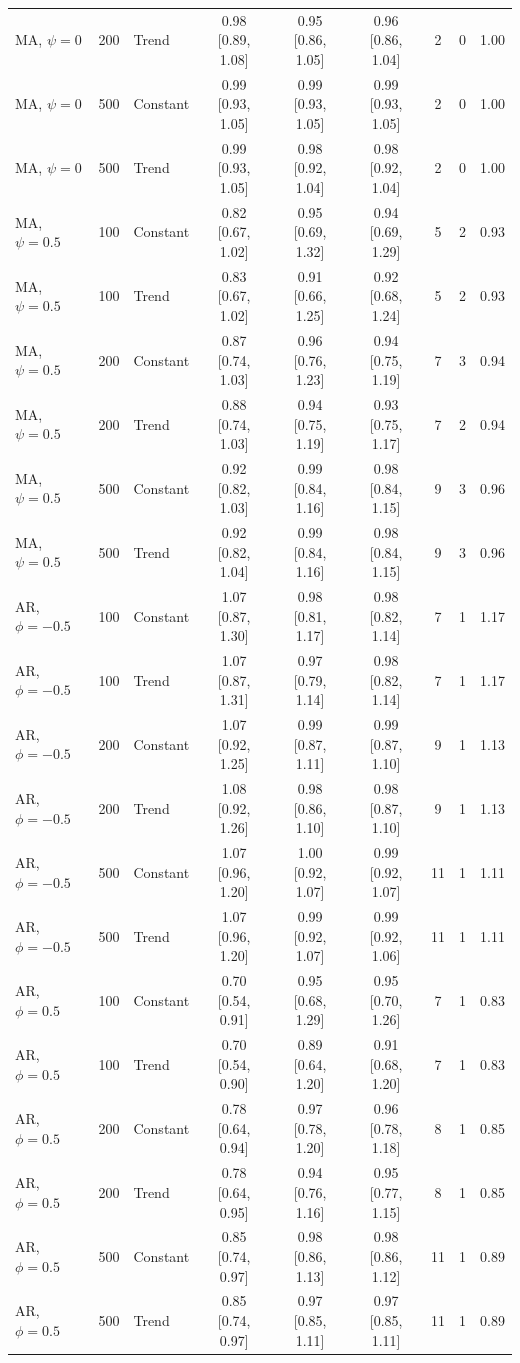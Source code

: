 \begin{tabular}{lrlcccccc}
MA, $\psi = 0$ & 200 & Trend & 0.98 [0.89, 1.08] & 0.95 [0.86, 1.05] & 0.96 [0.86, 1.04] & 2 & 0 & 1.00 \\
MA, $\psi = 0$ & 500 & Constant & 0.99 [0.93, 1.05] & 0.99 [0.93, 1.05] & 0.99 [0.93, 1.05] & 2 & 0 & 1.00 \\
MA, $\psi = 0$ & 500 & Trend & 0.99 [0.93, 1.05] & 0.98 [0.92, 1.04] & 0.98 [0.92, 1.04] & 2 & 0 & 1.00 \\
\addlinespace
MA, $\psi = 0.5$ & 100 & Constant & 0.82 [0.67, 1.02] & 0.95 [0.69, 1.32] & 0.94 [0.69, 1.29] & 5 & 2 & 0.93 \\
MA, $\psi = 0.5$ & 100 & Trend & 0.83 [0.67, 1.02] & 0.91 [0.66, 1.25] & 0.92 [0.68, 1.24] & 5 & 2 & 0.93 \\
MA, $\psi = 0.5$ & 200 & Constant & 0.87 [0.74, 1.03] & 0.96 [0.76, 1.23] & 0.94 [0.75, 1.19] & 7 & 3 & 0.94 \\
MA, $\psi = 0.5$ & 200 & Trend & 0.88 [0.74, 1.03] & 0.94 [0.75, 1.19] & 0.93 [0.75, 1.17] & 7 & 2 & 0.94 \\
MA, $\psi = 0.5$ & 500 & Constant & 0.92 [0.82, 1.03] & 0.99 [0.84, 1.16] & 0.98 [0.84, 1.15] & 9 & 3 & 0.96 \\
MA, $\psi = 0.5$ & 500 & Trend & 0.92 [0.82, 1.04] & 0.99 [0.84, 1.16] & 0.98 [0.84, 1.15] & 9 & 3 & 0.96 \\
\addlinespace
AR, $\phi = -0.5$ & 100 & Constant & 1.07 [0.87, 1.30] & 0.98 [0.81, 1.17] & 0.98 [0.82, 1.14] & 7 & 1 & 1.17 \\
AR, $\phi = -0.5$ & 100 & Trend & 1.07 [0.87, 1.31] & 0.97 [0.79, 1.14] & 0.98 [0.82, 1.14] & 7 & 1 & 1.17 \\
AR, $\phi = -0.5$ & 200 & Constant & 1.07 [0.92, 1.25] & 0.99 [0.87, 1.11] & 0.99 [0.87, 1.10] & 9 & 1 & 1.13 \\
AR, $\phi = -0.5$ & 200 & Trend & 1.08 [0.92, 1.26] & 0.98 [0.86, 1.10] & 0.98 [0.87, 1.10] & 9 & 1 & 1.13 \\
AR, $\phi = -0.5$ & 500 & Constant & 1.07 [0.96, 1.20] & 1.00 [0.92, 1.07] & 0.99 [0.92, 1.07] & 11 & 1 & 1.11 \\
AR, $\phi = -0.5$ & 500 & Trend & 1.07 [0.96, 1.20] & 0.99 [0.92, 1.07] & 0.99 [0.92, 1.06] & 11 & 1 & 1.11 \\
\addlinespace
AR, $\phi = 0.5$ & 100 & Constant & 0.70 [0.54, 0.91] & 0.95 [0.68, 1.29] & 0.95 [0.70, 1.26] & 7 & 1 & 0.83 \\
AR, $\phi = 0.5$ & 100 & Trend & 0.70 [0.54, 0.90] & 0.89 [0.64, 1.20] & 0.91 [0.68, 1.20] & 7 & 1 & 0.83 \\
AR, $\phi = 0.5$ & 200 & Constant & 0.78 [0.64, 0.94] & 0.97 [0.78, 1.20] & 0.96 [0.78, 1.18] & 8 & 1 & 0.85 \\
AR, $\phi = 0.5$ & 200 & Trend & 0.78 [0.64, 0.95] & 0.94 [0.76, 1.16] & 0.95 [0.77, 1.15] & 8 & 1 & 0.85 \\
AR, $\phi = 0.5$ & 500 & Constant & 0.85 [0.74, 0.97] & 0.98 [0.86, 1.13] & 0.98 [0.86, 1.12] & 11 & 1 & 0.89 \\
AR, $\phi = 0.5$ & 500 & Trend & 0.85 [0.74, 0.97] & 0.97 [0.85, 1.11] & 0.97 [0.85, 1.11] & 11 & 1 & 0.89 \\
\bottomrule
\end{tabular}
